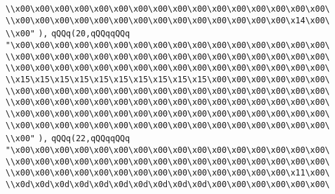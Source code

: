 \verb|\\x00\x00\x00\x00\x00\x00\x00\x00\x00\x00\x00\x00\x00\x00\x00\x00\|\newline
\verb|\\x00\x00\x00\x00\x00\x00\x00\x00\x00\x00\x00\x00\x00\x00\x14\x00\|\newline
\verb|\\x00"|\newline
\verb|),|\newline
\verb|qQQq(20,qQQqqQQq|\newline
\verb|"\x00\x00\x00\x00\x00\x00\x00\x00\x00\x00\x00\x00\x00\x00\x00\x00\|\newline
\verb|\\x00\x00\x00\x00\x00\x00\x00\x00\x00\x00\x00\x00\x00\x00\x00\x00\|\newline
\verb|\\x00\x00\x00\x00\x00\x00\x00\x00\x00\x00\x00\x00\x00\x00\x00\x00\|\newline
\verb|\\x15\x15\x15\x15\x15\x15\x15\x15\x15\x15\x00\x00\x00\x00\x00\x00\|\newline
\verb|\\x00\x00\x00\x00\x00\x00\x00\x00\x00\x00\x00\x00\x00\x00\x00\x00\|\newline
\verb|\\x00\x00\x00\x00\x00\x00\x00\x00\x00\x00\x00\x00\x00\x00\x00\x00\|\newline
\verb|\\x00\x00\x00\x00\x00\x00\x00\x00\x00\x00\x00\x00\x00\x00\x00\x00\|\newline
\verb|\\x00\x00\x00\x00\x00\x00\x00\x00\x00\x00\x00\x00\x00\x00\x00\x00\|\newline
\verb|\\x00"|\newline
\verb|),|\newline
\verb|qQQq(22,qQQqqQQq|\newline
\verb|"\x00\x00\x00\x00\x00\x00\x00\x00\x00\x00\x00\x00\x00\x00\x00\x00\|\newline
\verb|\\x00\x00\x00\x00\x00\x00\x00\x00\x00\x00\x00\x00\x00\x00\x00\x00\|\newline
\verb|\\x00\x00\x00\x00\x00\x00\x00\x00\x00\x00\x00\x00\x00\x00\x11\x00\|\newline
\verb|\\x0d\x0d\x0d\x0d\x0d\x0d\x0d\x0d\x0d\x0d\x00\x00\x00\x00\x00\x00\|\newline
